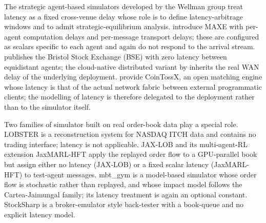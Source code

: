 \documentclass[11pt]{article}
\begin{document}
The strategic agent-based simulators developed by the Wellman group \citep{wahwellman2016,masciolwellman2024pymarketsim} treat latency as a fixed cross-venue delay whose role is to define latency-arbitrage windows and to admit strategic-equilibrium analysis. \citet{belcak2020maxe} introduce MAXE with per-agent computation delays and per-message transport delays; these are configured as scalars specific to each agent and again do not respond to the arrival stream. \citet{cliff2018bse} publishes the Bristol Stock Exchange (BSE) with zero latency between equidistant agents; the cloud-native distributed variant by \citet{milescliff2019dbse} inherits the real WAN delay of the underlying deployment. \citet{jericevich2022cointossx} provide CoinTossX, an open matching engine whose latency is that of the actual network fabric between external programmatic clients; the modelling of latency is therefore delegated to the deployment rather than to the simulator itself.

Two families of simulator built on real order-book data play a special role. LOBSTER \citep{huangpolak2011lobster} is a reconstruction system for NASDAQ ITCH data and contains no trading interface; latency is not applicable. JAX-LOB \citep{frey2023jaxlob} and its multi-agent-RL extension JaxMARL-HFT \citep{mohl2025jaxmarl} apply the replayed order flow to a GPU-parallel book but assign either no latency (JAX-LOB) or a fixed scalar latency (JaxMARL-HFT) to test-agent messages. mbt\_gym \citep{jerome2023mbtgym} is a model-based simulator whose order flow is stochastic rather than replayed, and whose impact model follows the Cartea-Jaimungal family; its latency treatment is again an optional constant. StockSharp \citep{stocksharp} is a broker-emulator style back-tester with a book-queue and no explicit latency model.
\end{document}
